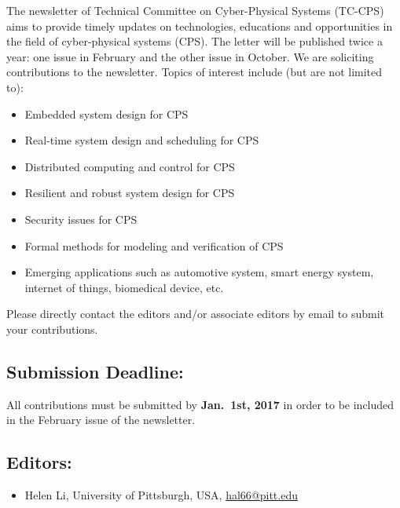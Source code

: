 

The newsletter of Technical Committee on Cyber-Physical Systems (TC-CPS) aims to provide timely updates on technologies, 
educations and opportunities in the field of cyber-physical systems (CPS).
The letter will be published twice a year: one issue in February and the other issue in October.
We are soliciting contributions to the newsletter. Topics of interest include (but are not limited to):

\begin{itemize}
    \item Embedded system design for CPS
    \item Real-time system design and scheduling for CPS
    \item Distributed computing and control for CPS
    \item Resilient and robust system design for CPS
    \item Security issues for CPS
    \item Formal methods for modeling and verification of CPS
    \item Emerging applications such as automotive system, smart energy system, internet of things, biomedical device, etc.
\end{itemize}

Please directly contact the editors and/or associate editors by email to submit your contributions.

\subsection*{Submission Deadline:}

All contributions must be submitted by \textbf{Jan.~1st, 2017} in order to be included in the February issue of the newsletter.

\subsection*{Editors:}
\begin{itemize}
    \item Helen Li, University of Pittsburgh, USA, \href{mailto:hal66@pitt.edu}{hal66@pitt.edu}
\end{itemize}

